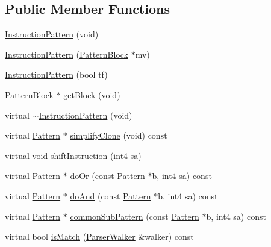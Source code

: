 \subsection*{Public Member Functions}
\begin{DoxyCompactItemize}
\item 
\mbox{\hyperlink{class_instruction_pattern_aa0bb8b1282a186a707f4809f8947a17d}{Instruction\+Pattern}} (void)
\item 
\mbox{\hyperlink{class_instruction_pattern_ab870093af41bb7026c5caad2a4a0c4cd}{Instruction\+Pattern}} (\mbox{\hyperlink{class_pattern_block}{Pattern\+Block}} $\ast$mv)
\item 
\mbox{\hyperlink{class_instruction_pattern_a29cccf4d6de13ac39a1f022bb86ef688}{Instruction\+Pattern}} (bool tf)
\item 
\mbox{\hyperlink{class_pattern_block}{Pattern\+Block}} $\ast$ \mbox{\hyperlink{class_instruction_pattern_a5edf1821ebaebb15cf835d80745e203e}{get\+Block}} (void)
\item 
virtual \mbox{\hyperlink{class_instruction_pattern_a935c0e36b286f4b025e99f8230e3a22d}{$\sim$\+Instruction\+Pattern}} (void)
\item 
virtual \mbox{\hyperlink{class_pattern}{Pattern}} $\ast$ \mbox{\hyperlink{class_instruction_pattern_ad257e6ff03279c9366d7568b011c72a5}{simplify\+Clone}} (void) const
\item 
virtual void \mbox{\hyperlink{class_instruction_pattern_a85d29caf8da56fad4bf0805f7fdeb4a8}{shift\+Instruction}} (int4 sa)
\item 
virtual \mbox{\hyperlink{class_pattern}{Pattern}} $\ast$ \mbox{\hyperlink{class_instruction_pattern_ae44ac91ca0f01f366cdd5e89d7fe0d06}{do\+Or}} (const \mbox{\hyperlink{class_pattern}{Pattern}} $\ast$b, int4 sa) const
\item 
virtual \mbox{\hyperlink{class_pattern}{Pattern}} $\ast$ \mbox{\hyperlink{class_instruction_pattern_ac56875a4e5fca7c5a3ea2a92a3afc47b}{do\+And}} (const \mbox{\hyperlink{class_pattern}{Pattern}} $\ast$b, int4 sa) const
\item 
virtual \mbox{\hyperlink{class_pattern}{Pattern}} $\ast$ \mbox{\hyperlink{class_instruction_pattern_a22b45bc904929f0f094a0a64174bb70c}{common\+Sub\+Pattern}} (const \mbox{\hyperlink{class_pattern}{Pattern}} $\ast$b, int4 sa) const
\item 
virtual bool \mbox{\hyperlink{class_instruction_pattern_a879ab052ff7d4082fde3bd53a457a21b}{is\+Match}} (\mbox{\hyperlink{class_parser_walker}{Parser\+Walker}} \&walker) const
\item 

\end{DoxyCompactItemize}
